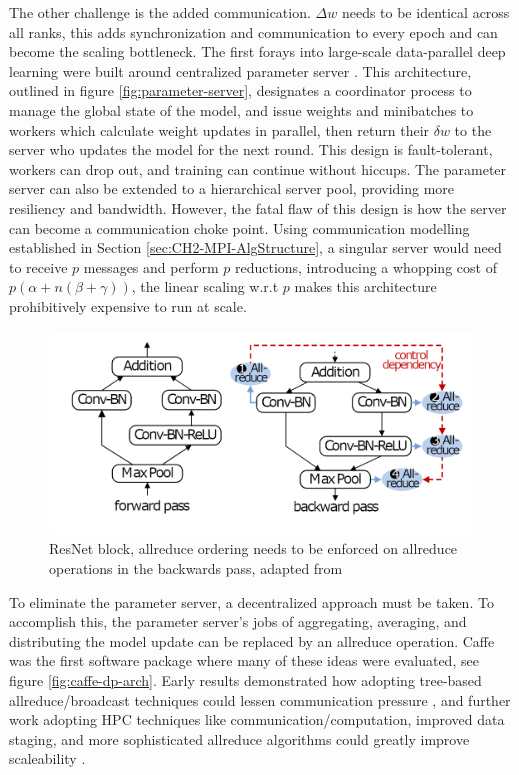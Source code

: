 The other challenge is the added communication.
$\Delta w$ needs to be identical across all ranks, this adds synchronization and communication to every epoch and can become the scaling bottleneck.
The first forays into large-scale data-parallel deep learning were built around centralized parameter server \cite{Dean2012DistBelif, Chilimbi2014ProjectAdam}.
This architecture, outlined in figure \ref{fig:parameter-server}, designates a coordinator process to manage the global state of the model, and issue weights and minibatches to workers which calculate weight updates in parallel, then return their $\delta w$ to the server who updates the model for the next round.
This design is fault-tolerant, workers can drop out, and training can continue without hiccups. 
The parameter server can also be extended to a hierarchical server pool, providing more resiliency and bandwidth. 
However, the fatal flaw of this design is how the server can become a communication choke point.
Using communication modelling established in Section \ref{sec:CH2-MPI-AlgStructure}, a singular server would need to receive $p$ messages and perform $p$ reductions, introducing a whopping cost of $p(\alpha+n(\beta+\gamma))$, the linear scaling w.r.t $p$ makes this architecture prohibitively expensive to run at scale.

\begin{figure}
    \centering
    \includegraphics[width=15cm]{3_Chapters/3_Chapter_DistributedDL/Figs/ResNet_block_control_dependency.png}
    \caption{ResNet block, allreduce ordering needs to be enforced on allreduce operations in the backwards pass, adapted from \cite{Li2020DLPartialColl}}
    \label{fig:ResNet-controll-dependency}
\end{figure}

To eliminate the parameter server, a decentralized approach must be taken.
To accomplish this, the parameter server's jobs of aggregating, averaging, and distributing the model update can be replaced by an allreduce operation.
Caffe was the first software package where many of these ideas were evaluated, see figure \ref{fig:caffe-dp-arch}.
Early results demonstrated how adopting tree-based allreduce/broadcast techniques could lessen communication pressure \cite{Iandola2016FireCaffe}, and further work adopting HPC techniques like communication/computation, improved data staging, and more sophisticated allreduce algorithms could greatly improve scaleability \cite{Awan2017SCaffe}.

